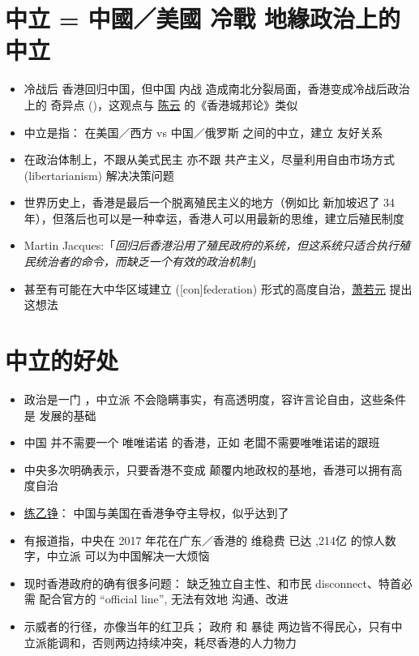 \section{中立 = 中國／美國 冷戰 地緣政治上的中立}
\begin{itemize}
	\item 冷战后 香港回归中国，但中国 内战 造成南北分裂局面，香港变成冷战后政治上的 奇异点 ()，这观点与 \underline{陈云} 的《香港城邦论》类似

	\item 中立是指： 在美国／西方 vs 中国／俄罗斯 之间的中立，建立  友好关系
	
	\item 在政治体制上，不跟从美式民主 亦不跟 共产主义，尽量利用自由市场方式 (libertarianism) 解决决策问题

	\item 世界历史上，香港是最后一个脱离殖民主义的地方（例如比 新加坡迟了 34 年），但落后也可以是一种幸运，香港人可以用最新的思维，建立后殖民制度

	\item Martin Jacques:「\textit{回归后香港沿用了殖民政府的系统，但这系统只适合执行殖民统治者的命令，而缺乏一个有效的政治机制}」

	\item 甚至有可能在大中华区域建立  ([con]federation) 形式的高度自治，\underline{萧若元} 提出这想法
\end{itemize}



\section{中立的好处}
\begin{itemize}
	\item 政治是一门 ，中立派 不会隐瞒事实，有高透明度，容许言论自由，这些条件是  发展的基础
	
	\item 中国 并不需要一个 唯唯诺诺 的香港，正如 老闆不需要唯唯诺诺的跟班
	
	\item 中央多次明确表示，只要香港不变成 颠覆内地政权的基地，香港可以拥有高度自治
	
	\item \underline{练乙铮}： 中国与美国在香港争夺主导权，似乎达到了 

	\item 有报道指，中央在 2017 年花在广东／香港的 维稳费 已达 ,214亿 的惊人数字，中立派 可以为中国解决一大烦恼

	\item 现时香港政府的确有很多问题： 缺乏独立自主性、和市民 disconnect、特首必需 配合官方的 ``official line'', 无法有效地 沟通、改进

	\item 示威者的行径，亦像当年的红卫兵； 政府 和 暴徒 两边皆不得民心，只有中立派能调和，否则两边持续冲突，耗尽香港的人力物力

\end{itemize}



